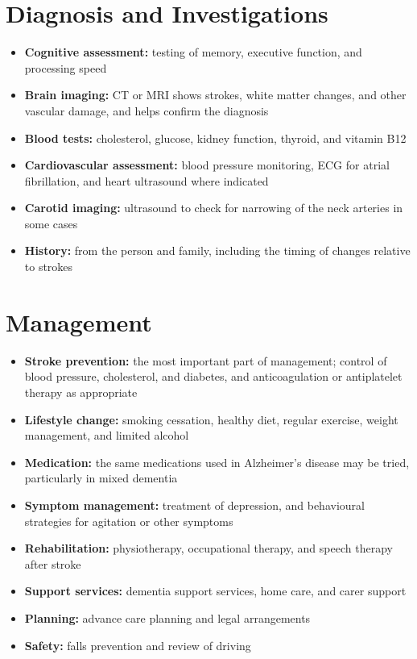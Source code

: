 \section*{Diagnosis and Investigations}
\begin{itemize}
    \item \textbf{Cognitive assessment:} testing of memory, executive function, and processing speed
    \item \textbf{Brain imaging:} CT or MRI shows strokes, white matter changes, and other vascular damage, and helps confirm the diagnosis
    \item \textbf{Blood tests:} cholesterol, glucose, kidney function, thyroid, and vitamin B12
    \item \textbf{Cardiovascular assessment:} blood pressure monitoring, ECG for atrial fibrillation, and heart ultrasound where indicated
    \item \textbf{Carotid imaging:} ultrasound to check for narrowing of the neck arteries in some cases
    \item \textbf{History:} from the person and family, including the timing of changes relative to strokes
\end{itemize}

\section*{Management}
\begin{itemize}
    \item \textbf{Stroke prevention:} the most important part of management; control of blood pressure, cholesterol, and diabetes, and anticoagulation or antiplatelet therapy as appropriate
    \item \textbf{Lifestyle change:} smoking cessation, healthy diet, regular exercise, weight management, and limited alcohol
    \item \textbf{Medication:} the same medications used in Alzheimer's disease may be tried, particularly in mixed dementia
    \item \textbf{Symptom management:} treatment of depression, and behavioural strategies for agitation or other symptoms
    \item \textbf{Rehabilitation:} physiotherapy, occupational therapy, and speech therapy after stroke
    \item \textbf{Support services:} dementia support services, home care, and carer support
    \item \textbf{Planning:} advance care planning and legal arrangements
    \item \textbf{Safety:} falls prevention and review of driving
\end{itemize}

